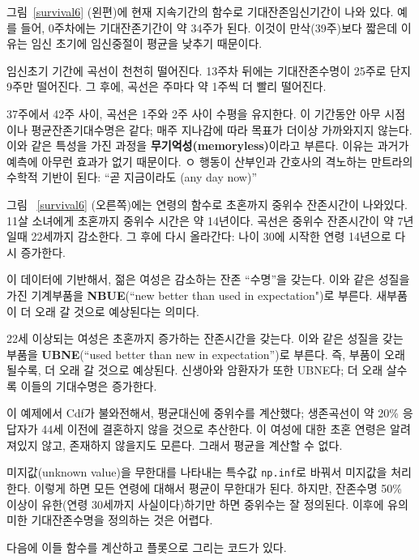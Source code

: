 그림~\ref{survival6} (왼편)에 현재 지속기간의 함수로 기대잔존임신기간이 나와 있다. 예를 들어, 0주차에는 기대잔존기간이 약 34주가 된다.
이것이 만삭(39주)보다 짧은데 이유는 임신 초기에 임신중절이 평균을 낮추기 때문이다. 

임신초기 기간에 곡선이 천천히 떨어진다. 13주차 뒤에는 기대잔존수명이 25주로 단지 9주만  떨어진다. 그 후에, 곡선은 주마다 약 1주씩 더 빨리 떨어진다. 

37주에서 42주 사이, 곡선은 1주와 2주 사이 수평을 유지한다. 이 기간동안 아무 시점이나 평균잔존기대수명은 같다; 매주 지나감에 따라 목표가 더이상 가까와지지 않는다. 이와 같은 특성을 가진 과정을 {\bf 무기억성(memoryless)}이라고 부른다. 이유는 과거가 예측에 아무런 효과가 없기 때문이다. 
ㅇ 행동이 산부인과 간호사의 격노하는 만트라의 수학적 기반이 된다: ``곧 지금이라도 (any day now)''

그림 ~\ref{survival6} (오른쪽)에는 연령의 함수로 초혼까지 중위수 잔존시간이 나와있다. 11살 소녀에게 초혼까지 중위수 시간은 약 14년이다. 곡선은 중위수 잔존시간이 약 7년일때 22세까지 감소한다.
그 후에 다시 올라간다: 나이 30에 시작한 연령 14년으로 다시 증가한다.

이 데이터에 기반해서, 젊은 여성은 감소하는 잔존 ``수명''을 갖는다.
이와 같은 성질을 가진 기계부품을 {\bf NBUE}(``new better than used in expectation")로 부른다. 새부품이 더 오래 갈 것으로 예상된다는 의미다.

22세 이상되는 여성은 초혼까지 증가하는 잔존시간을 갖는다.
이와 같은 성질을 갖는 부품을 {\bf UBNE}(``used better than new in expectation'')로 부른다. 즉, 부품이 오래될수록, 더 오래 갈 것으로 예상된다. 신생아와 암환자가 또한 UBNE다; 더 오래 살수록 이들의 기대수명은 증가한다.

이 예제에서 Cdf가 불와전해서, 평균대신에 중위수를 계산했다; 
생존곡선이 약 20\% 응답자가 44세 이전에 결혼하지 않을 것으로 추산한다. 이 여성에 대한 초혼 연령은 알려져있지 않고, 존재하지 않을지도 모른다. 그래서 평균을 계산할 수 없다.


미지값(unknown value)을 무한대를 나타내는 특수값 {\tt np.inf}로 바꿔서 미지값을 처리한다. 이렇게 하면 모든 연령에 대해서 평균이 무한대가 된다.
하지만, 잔존수명 50\% 이상이 유한(연령 30세까지 사실이다)하기만 하면 중위수는 잘 정의된다. 이후에 유의미한 기대잔존수명을 정의하는 것은 어렵다.

다음에 이들 함수를 계산하고 플롯으로 그리는 코드가 있다.

